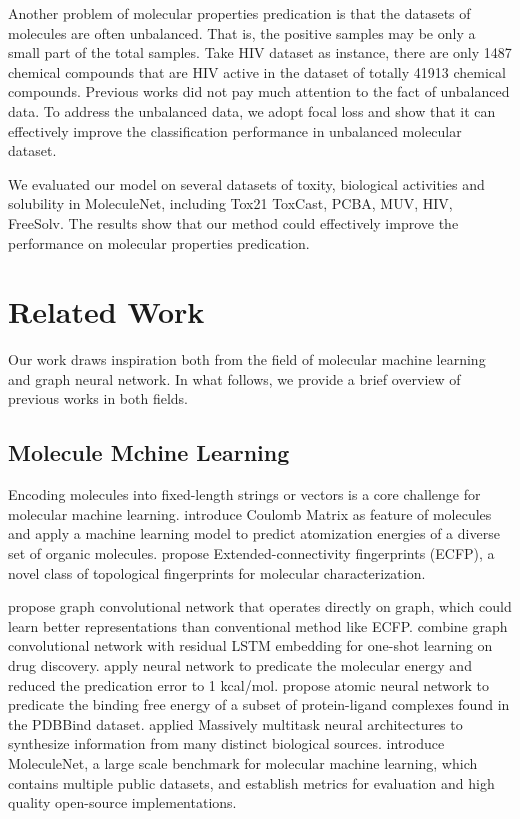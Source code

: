 \documentclass[letterpaper]{article} \usepackage{aaai18}  \usepackage{times}  \usepackage{helvet}  \usepackage{courier}  \usepackage{url}  \usepackage{graphicx}  \usepackage{amsmath}
\begin{document}
Another problem of molecular properties predication is that the datasets of molecules are often unbalanced. That is, the positive samples may be only a small part of the total samples. Take HIV dataset\cite{hiv} as instance, there are only 1487 chemical compounds that are HIV active in the dataset of totally 41913 chemical compounds. Previous works\cite{altae2017low,wu2017moleculenet} did not pay much attention to the fact of unbalanced data. To address the unbalanced data, we adopt focal loss\cite{lin2017focal} and show that it can effectively improve the classification performance in unbalanced molecular dataset.

We evaluated our model on several datasets of toxity, biological activities and solubility in MoleculeNet, including Tox21 ToxCast, PCBA, MUV, HIV, FreeSolv. The results show that our method could effectively improve the performance on molecular properties predication.


\section{Related Work}
Our work draws inspiration both from the field of molecular machine learning and graph neural network. In what follows, we provide a brief overview of previous works in both fields.

\subsection{Molecule Mchine Learning}
Encoding molecules into fixed-length strings or vectors is a core challenge for molecular machine learning. \cite{rupp2012fast} introduce Coulomb Matrix as feature of molecules and apply a machine learning model to predict atomization energies of a diverse set of organic molecules. \cite{rogers2010extended} propose Extended-connectivity fingerprints (ECFP), a novel class of topological fingerprints for molecular characterization.

\cite{duvenaud2015convolutional} propose graph convolutional network that operates directly on graph, which could learn better representations than conventional method like ECFP. \cite{altae2017low} combine graph convolutional network with residual LSTM embedding for one-shot learning on drug discovery. \cite{yao2017intrinsic,schutt2017quantum} apply neural network to predicate the molecular energy and reduced the predication error to 1 kcal/mol. \cite{gomes2017atomic} propose atomic neural network to predicate the binding free energy of a subset of protein-ligand complexes found in the PDBBind dataset.\cite{ramsundar2015massively} applied Massively multitask neural architectures to synthesize information from many distinct biological sources. \cite{wu2017moleculenet} introduce MoleculeNet, a large scale benchmark for molecular machine learning, which contains multiple public datasets, and establish metrics for evaluation and high quality open-source implementations.
\end{document}
